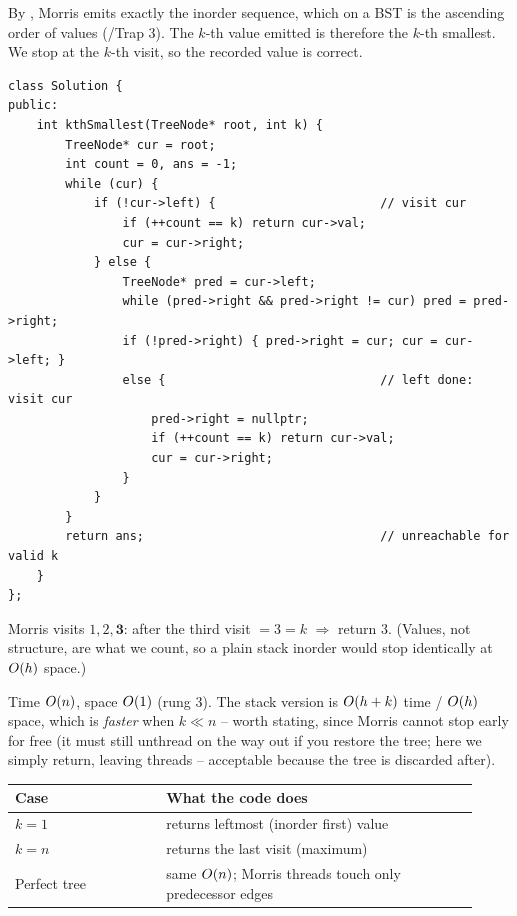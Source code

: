 \begin{proofbox}
By , Morris emits exactly the inorder sequence, which on a BST
is the ascending order of values (/Trap 3). The $k$-th value emitted
is therefore the $k$-th smallest. We stop at the $k$-th visit, so the recorded value is
correct.
\end{proofbox}

\begin{lstlisting}[caption={Kth Smallest via Morris (LeetCode 230)}, label={lst:c03-kth-smallest}]
class Solution {
public:
    int kthSmallest(TreeNode* root, int k) {
        TreeNode* cur = root;
        int count = 0, ans = -1;
        while (cur) {
            if (!cur->left) {                       // visit cur
                if (++count == k) return cur->val;
                cur = cur->right;
            } else {
                TreeNode* pred = cur->left;
                while (pred->right && pred->right != cur) pred = pred->right;
                if (!pred->right) { pred->right = cur; cur = cur->left; }
                else {                              // left done: visit cur
                    pred->right = nullptr;
                    if (++count == k) return cur->val;
                    cur = cur->right;
                }
            }
        }
        return ans;                                 // unreachable for valid k
    }
};
\end{lstlisting}

\begin{tracebox}[On BST \code{[3,1,4,null,2]}, $k=3$ (inorder $1,2,3,4$)]
Morris visits $1,2,\mathbf{3}$: after the third visit $=3=k$ $\Rightarrow$
return $3$. (Values, not structure, are what we count, so a plain stack inorder would
stop identically at $O(h)$ space.)
\end{tracebox}

\begin{complexitybox}
Time $O(n)$, space $O(1)$ (rung 3). The stack version is $O(h+k)$ time /
$O(h)$ space, which is \emph{faster} when $k \ll n$ -- worth stating, since Morris
cannot stop early for free (it must still unthread on the way out if you restore the
tree; here we simply return, leaving threads -- acceptable because the tree is discarded
after).
\end{complexitybox}

\begin{center}\renewcommand{\arraystretch}{1.2}
\begin{tabular}{@{}p{0.30\linewidth} p{0.62\linewidth}@{}}
\toprule
\textbf{Case} & \textbf{What the code does} \\
\midrule
$k=1$ & returns leftmost (inorder first) value \\
$k=n$ & returns the last visit (maximum) \\
Perfect tree & same $O(n)$; Morris threads touch only predecessor edges \\
\bottomrule
\end{tabular}\end{center}

